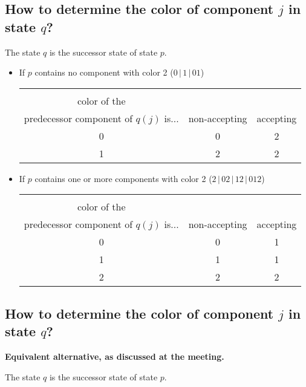 \documentclass[a4paper]{article}
\begin{document}
\subsection*{How to determine the color of component $j$ in state $q$?}

The state $q$ is the successor state of state $p$.

\begin{itemize} \itemsep2em
\item If $p$ contains no component with color 2 ($0\,|\,1\,|\,01$)

\begin{tabular}{|c|c|c|}
\hline
\backslashbox{The\\color of the\\predecessor component of $q(j)$ is...}{Component $q(j)$ is...} & non-accepting & accepting \\
\hline
0 & 0 & 2 \\
\hline
1 & 2 & 2 \\
\hline
\end{tabular}

\item If $p$ contains one or more components with color 2 ($2\,|\,02\,|\,12\,|\,012$)

\begin{tabular}{|c|c|c|}
\hline
\backslashbox{The\\color of the\\predecessor component of $q(j)$ is...}{Component $q(j)$ is...} & non-accepting & accepting \\
\hline
0 & 0 & 1 \\
\hline
1 & 1 & 1 \\
\hline
2 & 2 & 2 \\
\hline
\end{tabular}

\end{itemize}



\pagebreak



\subsection*{How to determine the color of component $j$ in state $q$?}

\textbf{Equivalent alternative, as discussed at the meeting.}

The state $q$ is the successor state of state $p$.
\end{document}
